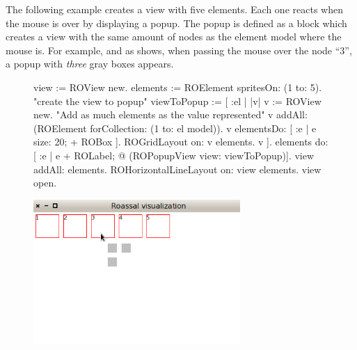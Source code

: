 \documentclass[a4paper,10pt,twoside]{book}
\begin{document}
The following example creates a view with five elements. Each one reacts when the mouse is over by displaying a popup. The popup is defined as a block which creates a view with the same amount of nodes as the element model where the mouse is. For example, and as  shows, when passing the mouse over the node ``3'', a popup with \textit{three} gray boxes appears.
\begin{figure}[H]
      \begin{minipage}[t]{1\textwidth}
      \vspace{0pt}
     \begin{code}{}
view := ROView new.
elements := ROElement spritesOn: (1 to: 5).
"create the view to popup"
viewToPopup := [ :el | |v| 
	              	              v := ROView new.
	              	              "Add as much elements as the value represented"
	              	              v addAll: (ROElement forCollection: (1 to: el model)).
	              	              v elementsDo: [ :e | e size: 20; + ROBox ].
	              	              ROGridLayout on: v elements.
	              	              v ].
elements do: [ :e | e + ROLabel;  @ (ROPopupView view: viewToPopup)].
view addAll: elements.
ROHorizontalLineLayout on: view elements.
view open.
\end{code}
\end{minipage}\hfill\begin{minipage}[t]{1\textwidth}
	 \vspace{0pt} \raggedright
       \centering
		\includegraphics[width=0.7\textwidth]{popupView2}
   \end{minipage}
\label{fig:popupView}
\caption{ }
\end{figure} 


%
%	
\end{document}
